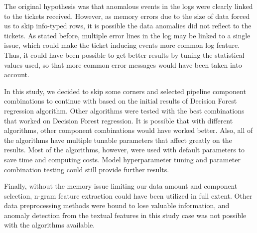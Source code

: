 The original hypothesis was
that anomalous events in the logs
were clearly linked to the tickets received.
However,
as memory errors due to the size of data forced us to skip info-typed rows,
it is possible the data anomalies did not reflect to the tickets.
As stated before,
multiple error lines in the log may be linked to a single issue,
which could make the ticket inducing events
more common log feature.
Thus,
it could have been possible to get better results
by tuning the statistical values used,
so that more common error messages would have been taken into account.

In this study,
we decided to skip some corners
and selected pipeline component combinations to continue with
based on the initial results of Decision Forest regression algorithm.
Other algorithms were tested with the best combinations
that worked on Decision Forest regression.
It is possible
that with different algorithms,
other component combinations would have worked better.
Also,
all of the algorithms have multiple tunable parameters
that affect greatly on the results.
Most of the algorithms, however,
were used with default parameters
to save time and computing costs.
Model hyperparameter tuning and parameter combination testing
could still provide further results.

Finally,
without the memory issue limiting our data amount and component selection,
n-gram feature extraction could have been utilized in full extent.
Other data preprocessing methods were bound to lose valuable information,
and anomaly detection from the textual features in this study case
was not possible with the algorithms available.


\clearpage